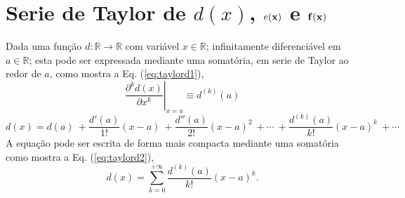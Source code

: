 
\section{Serie de Taylor de $d(x)$, $e(\VECTOR{x})$ e $\VECTOR{f}(\VECTOR{x})$}
\label{def:taylor}


\begin{proposition}\label{prop:taylord}
Dada uma função $d:\mathbb{R}\rightarrow \mathbb{R}$ com variável $x \in \mathbb{R}$;
infinitamente diferenciável em $a \in \mathbb{R}$;
esta pode ser expressada mediante uma somatória, em serie de Taylor 
\cite[pp. 764]{stewart2008calculus} \cite[pp. 281]{telles2015matematica} \cite{Taylor} 
ao redor de $a$, como
mostra a Eq. (\ref{eq:taylord1}),%
\begin{equation}\label{eq:taylord0a}
\left.\frac{\partial^k d(x)}{\partial x^k}\right|_{x=a}\equiv d^{(k)}(a) 
\end{equation}
\begin{equation}\label{eq:taylord1}
  d(x)=d(a)
      ~+\frac{d'(a)}{1!} (x-a)
      ~+\frac{d''(a)}{2!} (x-a)^{2}
      ~+\cdots 
      ~+\frac{d^{(k)}(a)}{k!} (x-a)^{k}
      ~+\cdots 
\end{equation}
A equação pode ser escrita de forma mais compacta mediante uma somatória  como mostra a Eq. (\ref{eq:taylord2}),
\begin{equation}\label{eq:taylord2}
  d(x)=\sum\limits_{k=0}^{+\infty} \frac{d^{(k)}(a)}{k!} (x-a)^{k}.
\end{equation}
\end{proposition}



